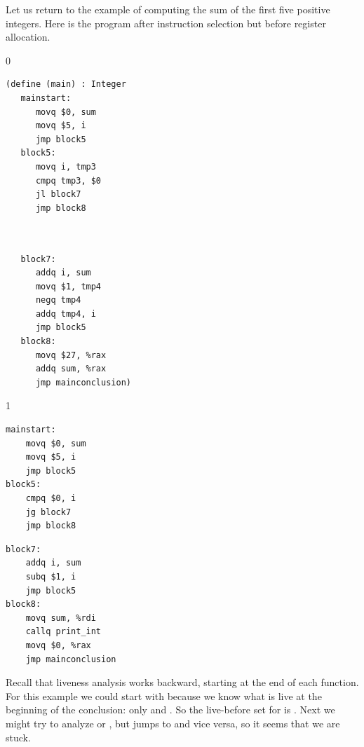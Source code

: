 \documentclass[7x10]{TimesAPriori_MIT}%
\def\racketEd{0}
\def\pythonEd{1}
\def\edition{1}
\newcommand{\pythonColor}[0]{}
\numberwithin{theorem}{chapter}
\numberwithin{definition}{chapter}
\numberwithin{equation}{chapter}
\begin{document}
Let us return to the example of computing the sum of the first five
positive integers. Here is the program after instruction
selection but before register
allocation.
\begin{center}
{\if\edition\racketEd    
  \begin{minipage}{0.45\textwidth}
\begin{lstlisting}
(define (main) : Integer
   mainstart:
      movq $0, sum
      movq $5, i
      jmp block5
   block5:
      movq i, tmp3
      cmpq tmp3, $0
      jl block7
      jmp block8
\end{lstlisting}
\end{minipage}
\begin{minipage}{0.45\textwidth}
  \begin{lstlisting}

    
   block7:
      addq i, sum
      movq $1, tmp4
      negq tmp4
      addq tmp4, i
      jmp block5
   block8:
      movq $27, %rax
      addq sum, %rax
      jmp mainconclusion)
\end{lstlisting}
  \end{minipage}
\fi}
{\if\edition\pythonEd\pythonColor
\begin{minipage}{0.45\textwidth}
\begin{lstlisting}
mainstart:
	movq $0, sum
	movq $5, i
	jmp block5
block5:
	cmpq $0, i
	jg block7
	jmp block8
\end{lstlisting}
\end{minipage}
\begin{minipage}{0.45\textwidth}
\begin{lstlisting}
block7:
	addq i, sum
	subq $1, i
	jmp block5
block8:
	movq sum, %rdi
	callq print_int
	movq $0, %rax
	jmp mainconclusion
\end{lstlisting}
  \end{minipage}
\fi}
\end{center}
Recall that liveness analysis works backward, starting at the end
of each function. For this example we could start with 
because we know what is live at the beginning of the conclusion:
only  and . So the live-before set
for  is .
%
Next we might try to analyze  or , but
 jumps to  and vice versa, so it seems that
we are stuck.
\end{document}
